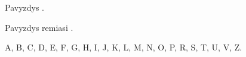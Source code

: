 \documentclass[12pt, a4paper, onecolumn, titlepage, oneside, intlimits, fleqn]{report}
\begin{document}
\myinit


Pavyzdys \citep{kernighan1988c}.

Pavyzdys remiasi \citet*{kernighan1988c}.

\myliterature

\clearpage
\begin{myappendices}

A, B, C, D, E, F, G, H, I, J, K, L, M, N, O, P, R, S, T, U, V, Z.

\end{myappendices}
\end{document}

